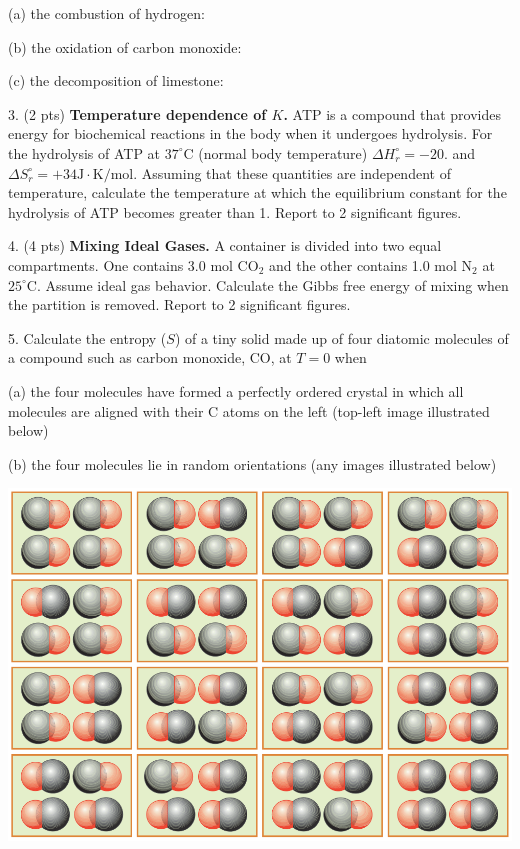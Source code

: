 \documentclass[11pt]{article}
\begin{document}
(a) the combustion of hydrogen: 

(b) the oxidation of carbon monoxide: 

(c) the decomposition of limestone: 

\vspace{3in}

3. (2 pts) \textbf{Temperature dependence of $K$.} ATP is a compound that provides energy
for biochemical reactions in the body when it undergoes hydrolysis. For the hydrolysis
of ATP at $37^\circ\text{C}$ (normal body temperature) $\Delta H^\circ_r = -20.$ and
$\Delta S_r^\circ = +34 \text{J}\cdot\text{K/mol}$. Assuming that these quantities are independent
of temperature, calculate the temperature at which the equilibrium constant for the
hydrolysis of ATP becomes greater than 1. Report to 2 significant figures.


\pagebreak

4. (4 pts) \textbf{Mixing Ideal Gases.} A container is divided into two equal compartments.
One contains 3.0 mol CO$_2$ and the other contains 1.0 mol N$_2$ at $25^\circ\text{C}$.
Assume ideal gas behavior. Calculate the Gibbs free energy of mixing when the partition
is removed. Report to 2 significant figures.


\vspace{3in}

5. Calculate the entropy ($S$) of a tiny solid made up of four diatomic molecules of a compound
such as carbon monoxide, CO, at $T=0$ when

(a) the four molecules have formed a perfectly ordered crystal in which all molecules are
aligned with their C atoms on the left (top-left image illustrated below)

(b) the four molecules lie in random orientations (any images illustrated below)

\begin{center}
  \includegraphics[scale=0.3]{carbon_mono.png}
\end{center}
\end{document}
